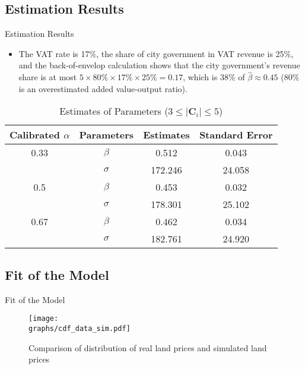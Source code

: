 \documentclass[xcolor={dvipsnames}]{beamer}
\theoremstyle{plain}
\newcommand{\graphs}{../../Graphs}
\begin{document}
\subsection{Estimation Results}
\begin{frame}{Estimation Results}
    \begin{itemize}
        \item The VAT rate is 17\%,
              the share of city government in VAT revenue is 25\%, and the back-of-envelop
              calculation shows that the city government's revenue share is at most
              $5 \times 80\% \times 17\% \times 25\% = 0.17$, which is 38\% of
              $\hat{\beta} \approx 0.45$ ($80\%$ is an overestimated added value-output ratio).
    \end{itemize}
    \begin{table}[H]
        \centering
        \caption*{Estimates of Parameters ($3 \leq |\mathbf{C}_i| \leq 5$)}
        \label{table: estimates (min_size=3 max_size=5 margin=2000)}
        \begin{tabular}{cccc}
            \toprule
            Calibrated $\alpha$ & Parameters & Estimates & Standard Error \\
            \midrule
            0.33                & $\beta$    & 0.512     & 0.043          \\
                                & $\sigma$   & 172.246   & 24.058         \\
            \midrule
            0.5                 & $\beta$    & 0.453     & 0.032          \\
                                & $\sigma$   & 178.301   & 25.102         \\
            \midrule
            0.67                & $\beta$    & 0.462     & 0.034          \\
                                & $\sigma$   & 182.761   & 24.920         \\
            \bottomrule
        \end{tabular}
    \end{table}


\end{frame}

\subsection{Fit of the Model}
\begin{frame}{Fit of the Model}
    \begin{figure}[H]
        \centering
        \caption*{Comparison of distribution of real land prices and simulated land prices}
        \texttt{[image: \\graphs/cdf\_data\_sim.pdf]}
        \label{price distribution}
    \end{figure}
\end{frame}
\end{document}
